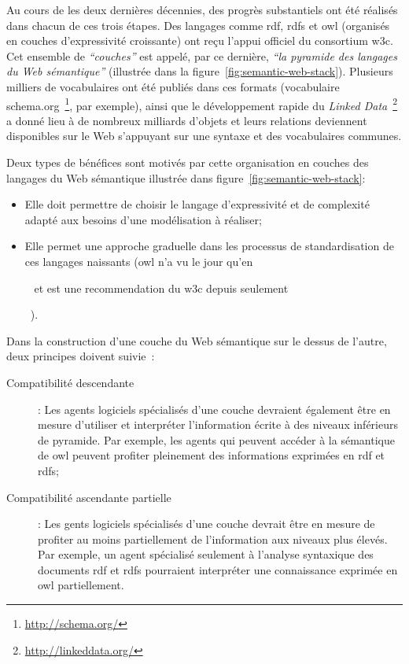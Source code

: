 

Au cours de les deux dernières décennies, des progrès substantiels ont
été réalisés dans chacun de ces trois étapes. Des langages comme
\acrshort{rdf}, \acrshort{rdfs} et \acrshort{owl} (organisés en
couches d'expressivité croissante) ont reçu l'appui officiel du
consortium \acrshort{w3c}. Cet ensemble de \emph{``couches''} est
appelé, par ce dernière, \emph{``la pyramide des langages du Web
  sémantique''} (illustrée dans la
figure~\ref{fig:semantic-web-stack}). Plusieurs milliers de
vocabulaires ont été publiés dans ces formats (vocabulaire
schema.org~\footnote{\url{http://schema.org/}}, par exemple), ainsi
que le développement rapide du \emph{Linked
  Data}~\footnote{\url{http://linkeddata.org/}} a donné lieu à de
nombreux milliards d'objets et leurs relations deviennent disponibles
sur le Web s'appuyant sur une syntaxe et des vocabulaires communes.

Deux types de bénéfices sont motivés par cette organisation en couches
des langages du Web sémantique illustrée dans
figure~\ref{fig:semantic-web-stack}:\medskip

\SpecialItem
\begin{itemize}
\item Elle doit permettre de choisir le langage d’expressivité et de
  complexité adapté aux besoins d'une modélisation à réaliser;\medskip

\item Elle permet une approche graduelle dans les processus de
  standardisation de ces langages naissants (\acrshort{owl} n'a vu
  le jour qu'en \date{2001}~\cite{fensel2001oil} et est une
  recommendation du \acrshort{w3c} depuis seulement
  \date{2004}~\cite{mcguinness2004owl}).\medskip
\end{itemize}
\enddescription

Dans la construction d'une couche du Web sémantique sur le dessus de
l'autre, deux principes doivent suivie~\cite{antoniou2012semantic}:

\renewcommand{\descriptionlabel}[1]{\hspace{0.5cm}\textbullet~\textsf{#1}}
\begin{description}
\item[Compatibilité descendante]: Les agents logiciels spécialisés
  d'une couche devraient également être en mesure d'utiliser et
  interpréter l'information écrite à des niveaux inférieurs de
  pyramide. Par exemple, les agents qui peuvent accéder à la
  sémantique de \acrshort{owl} peuvent profiter pleinement des
  informations exprimées en \acrshort{rdf} et \acrshort{rdfs};

\item[Compatibilité ascendante partielle ]: Les gents logiciels
  spécialisés d'une couche devrait être en mesure de profiter au moins
  \textsf{partiellement} de l'information aux niveaux plus élevés. Par
  exemple, un agent spécialisé seulement à l'analyse syntaxique des
  documents \acrshort{rdf} et \acrshort{rdfs} pourraient interpréter
  une connaissance exprimée en \acrshort{owl} partiellement.
\end{description}
\enddescription

